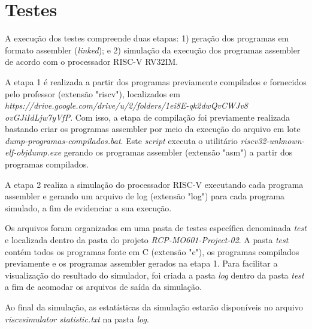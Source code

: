 
\section{Testes}

A execução dos testes compreende duas etapas: 1) geração dos programas em formato assembler (\textit{linked}); e 2) simulação da execução dos programas assembler de acordo com o processador RISC-V RV32IM.

A etapa 1 é realizada a partir dos programas previamente compilados e fornecidos pelo professor (extensão "riscv"), localizados em \textit{https://drive.google.com/drive/u/2/folders/1ei8E-qk2dwQvCWJv8 ovGJiIdLjw7yVfP}. Com isso, a etapa de compilação foi previamente realizada bastando criar os programas assembler por meio da execução do arquivo em lote \textit{dump-programas-compilados.bat}. Este \textit{script} executa o utilitário \textit{riscv32-unknown-elf-objdump.exe} gerando os programas assembler (extensão "asm") a partir dos programas compilados.

A etapa 2 realiza a simulação do processador RISC-V executando cada programa assembler e gerando um arquivo de log (extensão "log") para cada programa simulado, a fim de evidenciar a sua execução.

Os arquivos foram organizados em uma pasta de testes específica denominada \textit{test} e localizada dentro da pasta do projeto \textit{RCP-MO601-Project-02}. A pasta \textit{test} contém todos os programas fonte em C (extensão "c"), os programas compilados previamente e os programas assembler gerados na etapa 1. Para facilitar a visualização do resultado do simulador, foi criada a pasta \textit{log} dentro da pasta \textit{test} a fim de acomodar os arquivos de saída da simulação.

Ao final da simulação, as estatísticas da simulação estarão disponíveis no arquivo \textit{\textunderscore riscv\textunderscore simulator \textunderscore statistic.txt} na pasta \textit{log}.